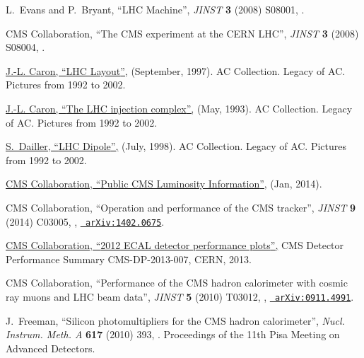 \documentclass[12pt]{thesis}  %
\begin{document}
\begin{thebibliography}{100}
\hrefCMSnoop {} {L.~Evans and P.~Bryant, ``{LHC Machine}'',} \textit{ JINST}
  \textbf{ 3} (2008) S08001,
\href{http://dx.doi.org/10.1088/1748-0221/3/08/S08001}{}.

\hrefCMSnoop {} {{ CMS} Collaboration, ``{The CMS experiment at the CERN
  LHC}'',} \textit{ JINST} \textbf{ 3} (2008) S08004,
\href{http://dx.doi.org/10.1088/1748-0221/3/08/S08004}{}.

\href {http://cds.cern.ch/record/841573} {J.-L. Caron, ``{LHC Layout}'',}
  (September, 1997). AC Collection. Legacy of AC. Pictures from 1992 to 2002.

\href {http://cds.cern.ch/record/841568} {J.-L. Caron, ``{The LHC injection
  complex}'',} (May, 1993). AC Collection. Legacy of AC. Pictures from 1992 to
  2002.

\href {http://cds.cern.ch/record/842253} {S.~Dailler, ``{LHC Dipole}'',} (July,
  1998). AC Collection. Legacy of AC. Pictures from 1992 to 2002.

\href {https://twiki.cern.ch/twiki/bin/view/CMSPublic/LumiPublicResults} {{
  CMS} Collaboration, ``{Public CMS Luminosity Information}'',} (Jan, 2014).

\hrefCMSnoop {} {{ CMS} Collaboration, ``{Operation and performance of the CMS
  tracker}'',} \textit{ JINST} \textbf{ 9} (2014) C03005,
  \href{http://dx.doi.org/10.1088/1748-0221/9/03/C03005}{},
\href{http://www.arXiv.org/abs/1402.0675}{\texttt{ arXiv:1402.0675}}.

\href {https://cds.cern.ch/record/1528235} {{ CMS} Collaboration, ``{2012 ECAL
  detector performance plots}'',} CMS Detector Performance Summary
  CMS-DP-2013-007, CERN, 2013.

\hrefCMSnoop {} {{ CMS} Collaboration, ``Performance of the CMS hadron
  calorimeter with cosmic ray muons and LHC beam data'',} \textit{ JINST}
  \textbf{ 5} (2010) T03012,
  \href{http://dx.doi.org/10.1088/1748-0221/5/03/T03012}{},
  \href{http://www.arXiv.org/abs/0911.4991}{\texttt{ arXiv:0911.4991}}.

\hrefCMSnoop {} {J.~Freeman, ``Silicon photomultipliers for the CMS hadron
  calorimeter'',} \textit{ Nucl. Instrum. Meth. A} \textbf{ 617} (2010) 393,
  \href{http://dx.doi.org/10.1016/j.nima.2009.10.132}{}.
  Proceedings of the 11th Pisa Meeting on Advanced Detectors.


\end{thebibliography}
\end{document}
